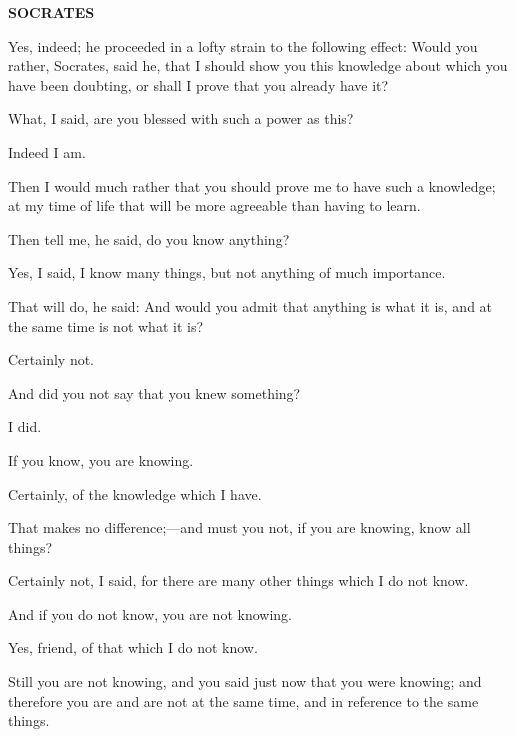 \documentclass[11pt,letter]{article}
\begin{document}
\par \textbf{SOCRATES}
\par   Yes, indeed; he proceeded in a lofty strain to the following effect:  Would you rather, Socrates, said he, that I should show you this knowledge about which you have been doubting, or shall I prove that you already have it?

\par  What, I said, are you blessed with such a power as this?

\par  Indeed I am.

\par  Then I would much rather that you should prove me to have such a knowledge; at my time of life that will be more agreeable than having to learn.

\par  Then tell me, he said, do you know anything?

\par  Yes, I said, I know many things, but not anything of much importance.

\par  That will do, he said: And would you admit that anything is what it is, and at the same time is not what it is?

\par  Certainly not.

\par  And did you not say that you knew something?

\par  I did.

\par  If you know, you are knowing.

\par  Certainly, of the knowledge which I have.

\par  That makes no difference;—and must you not, if you are knowing, know all things?

\par  Certainly not, I said, for there are many other things which I do not know.

\par  And if you do not know, you are not knowing.

\par  Yes, friend, of that which I do not know.

\par  Still you are not knowing, and you said just now that you were knowing; and therefore you are and are not at the same time, and in reference to the same things.
\end{document}

